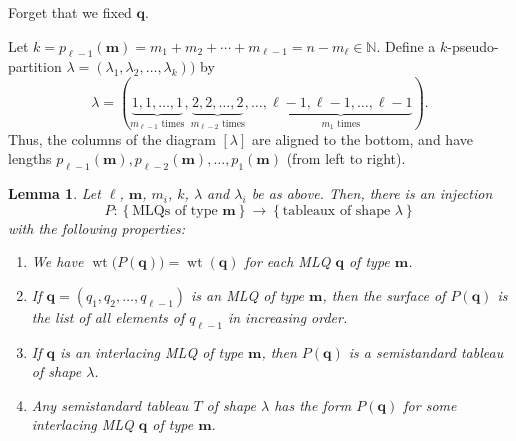 \documentclass[reqno]{amsart}
\newcommand{\0}{\phantom{c}}
\newcommand{\diag}[1]{\left[#1\right]} %
\DeclareMathOperator{\wt}{wt} %
\newcommand{\mm}{\mathbf{m}}
\newcommand{\qq}{\mathbf{q}}
\newcommand{\NN}{\mathbb{N}}
\newcommand{\set}[1]{\left\{ #1 \right\}}
\newcommand{\tup}[1]{\left( #1 \right)}
\theoremstyle{plain}
\newtheorem{lemma}[thm]{Lemma}
\theoremstyle{definition}
\numberwithin{equation}{section}
\newcommand{\Darij}[1]{\todo[size=\tiny,inline,color=red!30]{#1
      \\ \hfill --- Darij}}
\begin{document}
\Darij{TODO: Example.}

Forget that we fixed $\qq$.

Let $k = p_{\ell-1}(\mm) = m_1 + m_2 + \cdots + m_{\ell-1} = n - m_{\ell} \in \NN$.
Define a $k$-pseudo-partition $\lambda =\tup{\lambda_1, \lambda_2, \dotsc, \lambda_k})$ by
\begin{equation}
\label{eq.determinant_form.interlacing.lam}
\lambda = (
  \underbrace{1,1,\ldots,1}_{m_{\ell-1}\text{ times}},
  \underbrace{2,2,\ldots,2}_{m_{\ell-2}\text{ times}},
  \ldots,
  \underbrace{\ell-1,\ell-1,\ldots,\ell-1}_{m_1\text{ times}}
).
\end{equation}
Thus, the columns of the diagram $\diag{\lambda}$ are aligned to the bottom, and have lengths $p_{\ell-1}(\mm), p_{\ell-2}(\mm), \dotsc, p_1(\mm)$ (from left to right).

\begin{lemma}
\label{lem:determinant_form.bij1}
Let $\ell$, $\mm$, $m_i$, $k$, $\lambda$ and $\lambda_i$ be as above.
Then, there is an injection
\[
P \colon \set{ \text{MLQs of type } \mm } \to \set{ \text{tableaux of shape } \lambda }
\]
with the following properties:
\begin{enumerate}
\item[(a)] We have $\wt\bigl(  P(\qq) \bigr) = \wt(\qq)$ for each MLQ $\qq$ of type $\mm$.

\item[(b)] If $\qq = \tup{q_1, q_2, \dotsc, q_{\ell-1}}$ is an MLQ of type $\mm$, then the surface of $P(\qq)$ is the list of all elements of $q_{\ell-1}$ in increasing order.

\item[(c)] If $\qq$ is an interlacing MLQ of type $\mm$, then $P(\qq)$ is a semistandard tableau of shape $\lambda$.

\item[(d)] Any semistandard tableau $T$ of shape $\lambda$ has the form $P(\qq)$ for some interlacing MLQ $\qq$ of type $\mm$.
\end{enumerate}
\end{lemma}
\end{document}
